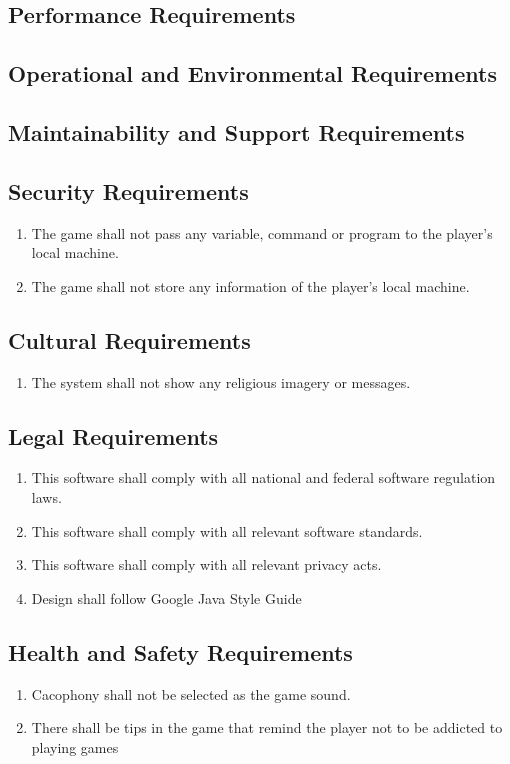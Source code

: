 \documentclass[12pt, titlepage]{article}
\begin{document}
\subsection{Performance Requirements}

\subsection{Operational and Environmental Requirements}

\subsection{Maintainability and Support Requirements}

\subsection{Security Requirements}
\begin{enumerate}[{SR}1. ]
	\item The game shall not pass any variable, command or program to the player’s local machine.
	\item The game shall not store any information of the player’s local machine.
\end{enumerate}

\subsection{Cultural Requirements}
\begin{enumerate}[{CR}1. ]
	\item The system shall not show any religious imagery or messages.
\end{enumerate}
\subsection{Legal Requirements}
\begin{enumerate}[{LR}1. ]
	    \item This software shall comply with all national and federal software regulation laws.
        \item This software shall comply with all relevant software standards.
        \item This software shall comply with all relevant privacy acts.
        \item Design shall follow Google Java Style Guide
\end{enumerate}
\subsection{Health and Safety Requirements}
\begin{enumerate}[{HS}1. ]
	    \item Cacophony shall not be selected as the game sound.
	    \item There shall be tips in the game that remind the player not to be addicted to playing games
\end{enumerate}
\end{document}
